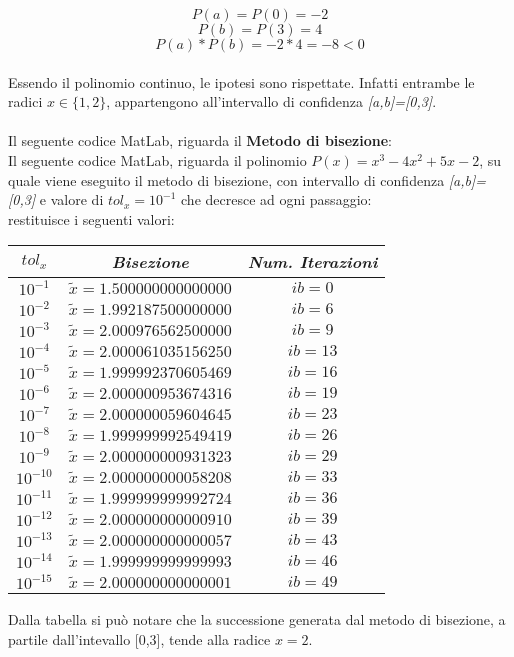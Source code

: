 	\[
	P(a) = P(0) = -2
	\]
	\[
	P(b) = P(3) = 4
	\]
	\[
	P(a)*P(b) = -2 * 4 = -8 < 0
	\]\\
Essendo il polinomio continuo, le ipotesi sono rispettate. Infatti entrambe le radici $x \in \{1,2\}$, appartengono all'intervallo di confidenza \textit{[a,b]=[0,3]}.\\\\
Il seguente codice MatLab, riguarda il \textbf{Metodo di bisezione}:\\
	
Il seguente codice MatLab, riguarda il polinomio $P(x) = x^3-4x^2+5x-2$, su quale viene eseguito il metodo di bisezione, con intervallo di confidenza \textit{[a,b]=[0,3]} e valore di $tol_x=10^{-1}$ che decresce ad ogni passaggio:\\
	
restituisce i seguenti valori:\\
\begin{center}
	\begin{tabular}{|c|c|c|}
		\hline
			$tol_x$ & \textit{Bisezione} & \textit{Num. Iterazioni} \\
		\hline
   			$10^{-1}$ & $\tilde{x} = 1.500000000000000$ & $ib = 0$\\
    		$10^{-2}$ & $\tilde{x} = 1.992187500000000$ & $ib = 6$\\
    		$10^{-3}$ & $\tilde{x} = 2.000976562500000$ & $ib = 9$\\
    		$10^{-4}$ & $\tilde{x} = 2.000061035156250$ & $ib = 13$\\
   			$10^{-5}$ & $\tilde{x} = 1.999992370605469$ & $ib = 16$\\
   			$10^{-6}$ & $\tilde{x} = 2.000000953674316$ & $ib = 19$\\
    		$10^{-7}$ & $\tilde{x} = 2.000000059604645$ & $ib = 23$\\
    		$10^{-8}$ & $\tilde{x} = 1.999999992549419$ & $ib = 26$\\
    		$10^{-9}$ & $\tilde{x} = 2.000000000931323$ & $ib= 29$\\
    		$10^{-10}$ & $\tilde{x} = 2.000000000058208$ & $ib = 33$\\
    		$10^{-11}$ & $\tilde{x} = 1.999999999992724$ & $ib = 36$\\
    		$10^{-12}$ & $\tilde{x} = 2.000000000000910$ & $ib = 39$\\
    		$10^{-13}$ & $\tilde{x} = 2.000000000000057$ & $ib = 43$\\
    		$10^{-14}$ & $\tilde{x} = 1.999999999999993$ & $ib = 46$\\
    		$10^{-15}$ & $\tilde{x} = 2.000000000000001$ & $ib = 49$\\
		\hline
	\end{tabular}
\end{center}
Dalla tabella si può notare che la successione generata dal metodo di bisezione, a partile dall'intevallo [0,3], tende alla radice $x = 2$.